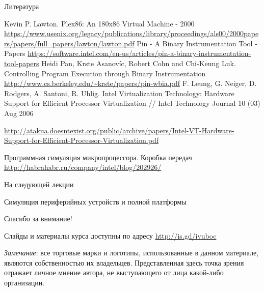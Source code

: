 \begin{frame}[allowframebreaks]{Литература}
\begin{thebibliography}{99}
     Kevin P. Lawton. Plex86: An 180x86 Virtual Machine - 2000 \url{https://www.usenix.org/legacy/publications/library/proceedings/als00/2000papers/papers/full_papers/lawton/lawton.pdf}
     Pin - A Binary Instrumentation Tool - Papers \url{https://software.intel.com/en-us/articles/pin-a-binary-instrumentation-tool-papers}
     Heidi Pan, Krste Asanovíc, Robert Cohn and Chi-Keung Luk. Controlling Program Execution through Binary Instrumentation \url{http://www.cs.berkeley.edu/~krste/papers/pin-wbia.pdf}
     F. Leung, G. Neiger, D. Rodgers, A. Santoni, R. Uhlig. Intel Virtualization Technology: Hardware Support for Efficient Processor Virtualization // Intel Technology Journal 10 (03) Aug 2006

    {\scriptsize\url{http://atakua.doesntexist.org/public/archive/papers/Intel-VT-Hardware-Support-for-Efficient-Processor-Virtualization.pdf}}

     Программная симуляция микропроцессора. Коробка передач \url{http://habrahabr.ru/company/intel/blog/202926/}
\end{thebibliography}
\end{frame}


\begin{frame}{На следующей лекции}
\centering

Симуляция периферийных устройств и полной платформы

\end{frame}

\begin{frame}

{\huge{Спасибо за внимание!}\par}

\vfill

Слайды и материалы курса доступны по адресу \url{http://is.gd/ivuboc} %

\vfill

\tiny{\textit{Замечание}: все торговые марки и логотипы, использованные в данном материале, являются собственностью их владельцев. Представленная здесь точка зрения отражает личное мнение автора, не выступающего от лица какой-либо организации.}

\end{frame}


